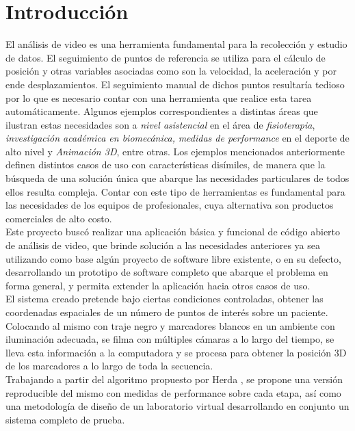 \section{Introducción}
El análisis de video  es  una  herramienta  fundamental para la recolección y estudio de datos. El seguimiento de puntos de referencia se utiliza para el cálculo de posición y otras variables asociadas como son la velocidad, la aceleración y por ende desplazamientos. 
El seguimiento manual de dichos puntos resultaría tedioso por lo que es necesario contar con una herramienta que realice esta tarea automáticamente.
Algunos ejemplos correspondientes a distintas áreas que ilustran estas necesidades son a \emph{nivel asistencial} en el área de \emph{fisioterapia}, \emph{investigación académica en biomecánica,} \emph{medidas de performance} en el deporte de alto nivel y \emph{Animación 3D}, entre otras. 
Los ejemplos mencionados anteriormente definen distintos casos de uso con características disímiles, de manera que la búsqueda de una solución única que abarque las necesidades particulares de todos ellos resulta compleja. Contar con este tipo de herramientas es fundamental para las necesidades de los equipos de profesionales, cuya alternativa son productos comerciales de alto costo.\\
\hspace*{0.5cm}Este proyecto buscó realizar una aplicación básica y funcional de código abierto de análisis de video, que brinde solución a las necesidades anteriores ya sea utilizando como base algún  proyecto  de  software  libre  existente, o en su defecto, desarrollando un prototipo de software completo que abarque el problema en forma general, y permita extender la aplicación hacia otros casos de uso.\\
\hspace*{0.5cm}El sistema creado pretende bajo ciertas condiciones controladas, obtener las coordenadas espaciales de un número de puntos de interés sobre un paciente. 
Colocando al mismo con traje negro y marcadores blancos en un ambiente con iluminación adecuada, se filma con múltiples cámaras a lo largo del tiempo, se lleva esta información a la computadora y se procesa para obtener la posición 3D de los marcadores a lo largo de toda la secuencia.\\
\hspace*{0.5cm}Trabajando a partir del algoritmo propuesto por Herda \cite{herda}, se propone una versión reproducible del mismo con medidas de performance sobre cada etapa, así como una metodología de diseño de un laboratorio virtual desarrollando en conjunto  un sistema completo de prueba.


